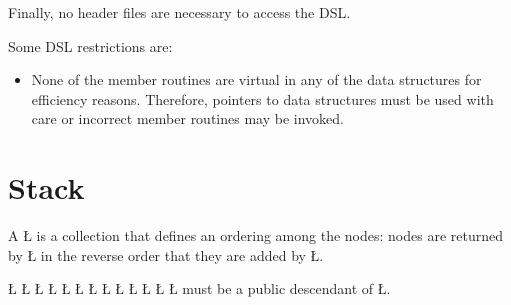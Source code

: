 \documentclass[openright,twoside]{report}
\begin{document}
Finally, no header files are necessary to access the \uC DSL.

Some \uC DSL restrictions are:
\begin{itemize}
\item
None of the member routines are virtual in any of the data structures for efficiency reasons.
Therefore, pointers to data structures must be used with care or incorrect member routines may be invoked.
\end{itemize}


\section{Stack}
%
%

A \LGinlinetrue\LGbegin\lgrinde\L{}\endlgrinde\LGend{} is a collection that defines an ordering among the nodes: nodes are returned by \LGinlinetrue\LGbegin\lgrinde\L{}\endlgrinde\LGend{} in the reverse order that they are added by \LGinlinetrue\LGbegin\lgrinde\L{}\endlgrinde\LGend{}.
\begin{center}

\end{center}
\LGinlinefalse\LGbegin\lgrinde
\L{}
\L{}
\L{\LB{}}
\L{\LB{}}
\L{\LB{}}
\L{\LB{}}
\L{\LB{}}
\L{\LB{}}
\L{\LB{}}
\L{\LB{}}
\L{\LB{}}
\L{\LB{\};}}
\endlgrinde\LGend
{}%
%
%
%
%
%
%
%
\LGinlinetrue\LGbegin\lgrinde\L{}\endlgrinde\LGend{} must be a public descendant of \LGinlinetrue\LGbegin\lgrinde\L{}\endlgrinde\LGend{}.
\end{document}
